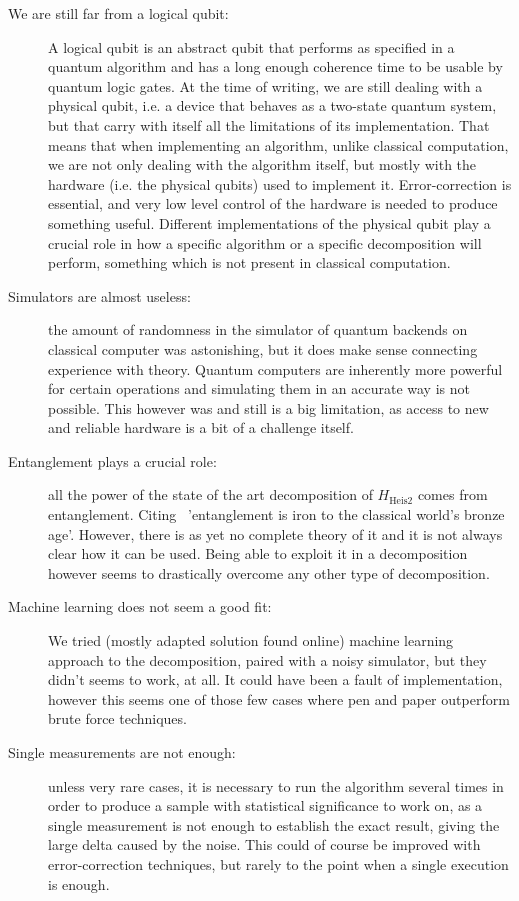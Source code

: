 \begin{description}
    \item[We are still far from a logical qubit: ] A logical qubit is an abstract qubit that performs as specified in a quantum algorithm and has a long enough coherence time to be usable by quantum logic gates. At the time of writing, we are still dealing with a physical qubit, i.e. a device that behaves as a two-state quantum system, but that carry with itself all the limitations of its implementation. That means that when implementing an algorithm, unlike classical computation, we are not only dealing with the algorithm itself, but mostly with the hardware (i.e. the physical qubits) used to implement it. Error-correction is essential, and very low level control of the hardware is needed to produce something useful. Different implementations of the physical qubit play a crucial role in how a specific algorithm or a specific decomposition will perform, something which is not present in classical computation.
    \item[Simulators are almost useless: ]the amount of randomness in the simulator of quantum backends on classical computer was astonishing, but it does make sense connecting experience with theory. Quantum computers are inherently more powerful for certain operations and simulating them in an accurate way is not possible. This however was and still is a big limitation, as access to new and reliable hardware is a bit of a challenge itself.
    \item[Entanglement plays a crucial role: ] all the power of the state of the art decomposition of $H_{\text{Heis2}}$ comes from entanglement. Citing~\cite{NielsenChuang} 'entanglement is iron to the classical world's bronze age'. However, there is as yet no complete theory of it and it is not always clear how it can be used. Being able to exploit it in a decomposition however seems to drastically overcome any other type of decomposition.
    \item[Machine learning does not seem a good fit: ] We tried (mostly adapted solution found online) machine learning approach to the decomposition, paired with a noisy simulator, but they didn't seems to work, at all. It could have been a fault of implementation, however this seems one of those few cases where pen and paper outperform brute force techniques.
    \item[Single measurements are not enough: ]unless very rare cases, it is necessary to run the algorithm several times in order to produce a sample with statistical significance to work on, as a single measurement is not enough to establish the exact result, giving the large delta caused by the noise. This could of course be improved with error-correction techniques, but rarely to the point when a single execution is enough.

\end{description}


